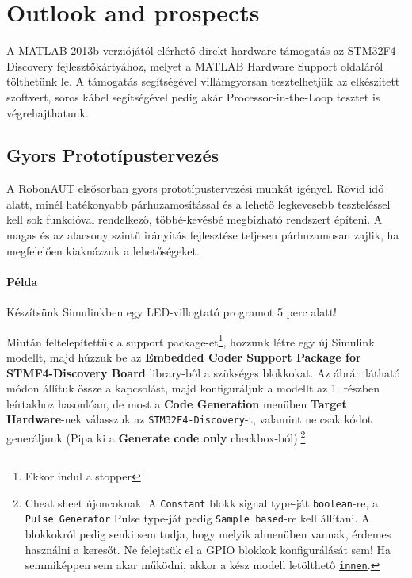 \section{Outlook and prospects}

A MATLAB 2013b verziójától elérhető direkt hardware-támogatás az STM32F4 Discovery fejlesztőkártyához, melyet a MATLAB Hardware Support oldaláról tölthetünk le. A támogatás segítségével villámgyorsan tesztelhetjük az elkészített szoftvert, soros kábel segítségével pedig akár Processor-in-the-Loop tesztet is végrehajthatunk\cite[]{pilveri}.

\subsection{Gyors Prototípustervezés}

A RobonAUT elsősorban gyors prototípustervezési munkát igényel. Rövid idő alatt, minél hatékonyabb párhuzamosítással és a lehető legkevesebb teszteléssel kell sok funkcióval rendelkező, többé-kevésbé megbízható rendszert építeni. A magas és az alacsony szintű irányítás fejlesztése teljesen párhuzamosan zajlik, ha megfelelően kiaknázzuk a lehetőségeket.

\paragraph{Példa} Készítsünk Simulinkben egy LED-villogtató programot 5 perc alatt!

Miután feltelepítettük a support package-et\footnote{Ekkor indul a stopper}, hozzunk létre egy új Simulink modellt, majd húzzuk be az \textbf{Embedded Coder Support Package for STMF4-Discovery Board} library-ből a szükséges blokkokat. Az ábrán látható módon állítuk össze a kapcsolást, majd konfiguráljuk a modellt az 1. részben leírtakhoz hasonlóan, de most a \textbf{Code Generation} menüben \textbf{Target Hardware}-nek válasszuk az \verb!STM32F4-Discovery!-t, valamint ne csak kódot generáljunk (Pipa ki a \textbf{Generate code only} checkbox-ból).\footnote{Cheat sheet újoncoknak: A \texttt{Constant} blokk signal type-ját  \texttt{boolean}-re, a  \texttt{Pulse Generator} Pulse type-ját pedig  \texttt{Sample based}-re kell állítani. A blokkokról pedig senki sem tudja, hogy melyik almenüben vannak, érdemes használni a keresőt. Ne felejtsük el a GPIO blokkok konfigurálását sem! Ha semmiképpen sem akar működni, akkor a kész modell letölthető \href{http://www.mathworks.com/matlabcentral/fileexchange/45953-stm32f4-discovery-led-blinker}{\texttt{innen}}.}

